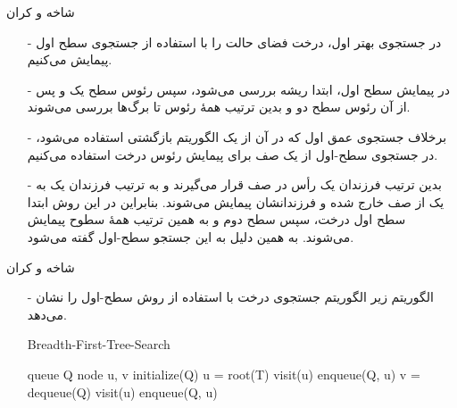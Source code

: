 \begin{frame}{شاخه و کران}
\begin{itemize}\itemr
\item[-]
در جستجوی بهتر اول، درخت فضای حالت را با استفاده از جستجوی سطح اول
 پیمایش می‌کنیم.
\item[-]
در پیمایش سطح اول، ابتدا ریشه بررسی می‌شود، سپس رئوس سطح یک و پس از آن رئوس سطح دو و بدین ترتیب همهٔ رئوس تا برگ‌ها بررسی می‌شوند.
\item[-]
برخلاف جستجوی عمق اول که در آن از یک الگوریتم بازگشتی استفاده می‌شود، در جستجوی سطح-اول از یک صف برای پیمایش رئوس درخت استفاده می‌کنیم.
\item[-]
بدین ترتیب فرزندان یک رأس در صف قرار می‌گیرند و به ترتیب فرزندان یک به یک از صف خارج شده و فرزندانشان پیمایش می‌شوند. بنابراین در این روش ابتدا سطح اول درخت، سپس سطح دوم و به همین ترتیب همهٔ سطوح پیمایش می‌شوند. به همین دلیل به این جستجو سطح-اول گفته می‌شود.
\end{itemize}
\end{frame}


\begin{frame}{شاخه و کران}
\begin{itemize}\itemr
\item[-]
الگوریتم زیر الگوریتم جستجوی درخت با استفاده از روش سطح-اول را نشان می‌دهد.
\begin{algorithm}[H]\alglr
  \caption{Breadth-First-Tree-Search} 
  \begin{algorithmic}[1]
   \State queue Q
   \State node u, v
   \State initialize(Q)		
   \State u = root(T)
   \State visit(u)
   \State enqueue(Q, u)
   		\State v = dequeue(Q)
   				\State visit(u)
   				\State enqueue(Q, u)
   		\EndFor
   \EndWhile                        
  \end{algorithmic}
  \label{alg:merge}
\end{algorithm}
\end{itemize}
\end{frame}